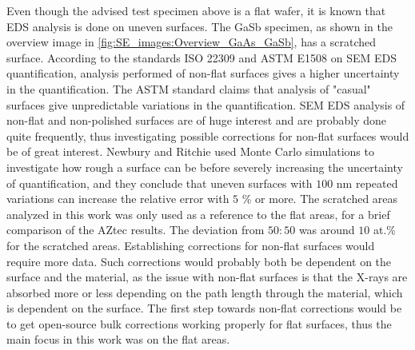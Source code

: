


Even though the advised test specimen above is a flat wafer, it is known that EDS analysis is done on uneven surfaces.
The GaSb specimen, as shown in the overview image in \cref{fig:SE_images:Overview_GaAs_GaSb}, has a scratched surface.
According to the standards ISO 22309 \cite{iso_quantification_22309} and ASTM E1508 \cite{astm_e1508_eds_quantification} on SEM EDS quantification, analysis performed of non-flat surfaces gives a higher uncertainty in the quantification.
The ASTM standard claims that analysis of "casual" surfaces give unpredictable variations in the quantification.
SEM EDS analysis of non-flat and non-polished surfaces are of huge interest and are probably done quite frequently, thus investigating possible corrections for non-flat surfaces would be of great interest.
Newbury and Ritchie \cite{newbury_ritchie_2013_flatness} used Monte Carlo simulations to investigate how rough a surface can be before severely increasing the uncertainty of quantification, and they conclude that uneven surfaces with $100$ nm repeated variations can increase the relative error with $5$ \% or more.
The scratched areas analyzed in this work was only used as a reference to the flat areas, for a brief comparison of the AZtec results.
The deviation from $50:50$ was around $10$ at.\% for the scratched areas.
Establishing corrections for non-flat surfaces would require more data.
Such corrections would probably both be dependent on the surface and the material, as the issue with non-flat surfaces is that the X-rays are absorbed more or less depending on the path length through the material, which is dependent on the surface.
The first step towards non-flat corrections would be to get open-source bulk corrections working properly for flat surfaces, thus the main focus in this work was on the flat areas.








